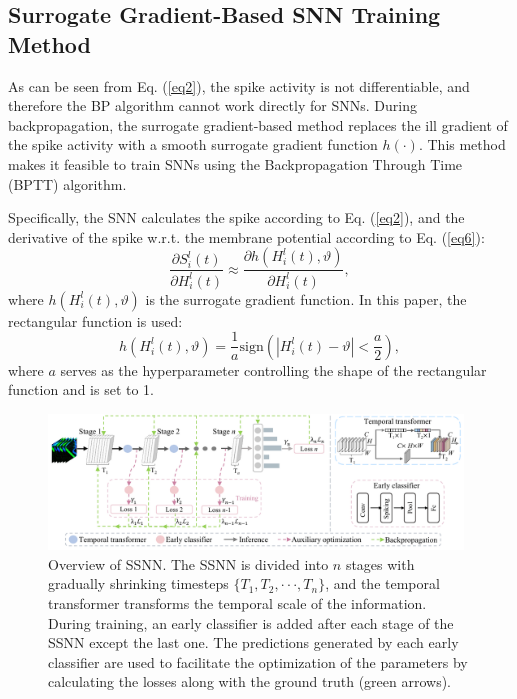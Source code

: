 \documentclass[letterpaper]{article} %
\begin{document}
\subsection{Surrogate Gradient-Based SNN Training Method}

As can be seen from Eq. (\ref{eq2}), the spike activity is not differentiable, and therefore the BP algorithm cannot work directly for SNNs. During backpropagation, the surrogate gradient-based method replaces the ill gradient of the spike activity with a smooth surrogate gradient function $h(\cdot)$. This method makes it feasible to train SNNs using the Backpropagation Through Time (BPTT) algorithm.

Specifically, the SNN calculates the spike according to Eq. (\ref{eq2}), and the derivative of the spike w.r.t. the membrane potential according to Eq. (\ref{eq6}):
\begin{equation}
\frac{\partial S_{i}^{l}(t)}{\partial H_{i}^{l}(t)} \approx \frac{\partial h(H_{i}^{l}(t), \vartheta)}{\partial H_{i}^{l}(t)},
\label{eq6}
\end{equation}
where $h(H_{i}^{l}(t),\vartheta)$ is the surrogate gradient function. In this paper, the rectangular function \cite{STBP} is used:
\begin{equation}
h(H_{i}^{l}(t),\vartheta) = \frac{1}{a} \text{sign}(|H_{i}^{l}(t)-\vartheta|<\frac{a}{2}),
\label{eq7}
\end{equation}
where $a$ serves as the hyperparameter controlling the shape of the rectangular function and is set to 1.

\begin{figure}[t]
\centering
\includegraphics[width=0.98\textwidth]{TSAC} %
\caption{Overview of SSNN. The SSNN is divided into $n$ stages with gradually shrinking timesteps $\{T_1,T_2,\cdot \cdot \cdot, T_n\}$, and the temporal transformer transforms the temporal scale of the information. During training, an early classifier is added after each stage of the SSNN except the last one. The predictions generated by each early classifier are used to facilitate the optimization of the parameters by calculating the losses along with the ground truth (green arrows).}
\label{TSAC}
\end{figure}
\end{document}
